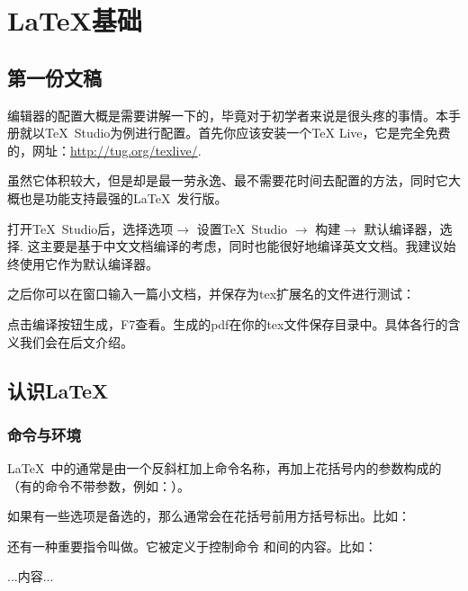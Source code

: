 \chapter{\LaTeX{}基础}
\section{第一份文稿}

编辑器的配置大概是需要讲解一下的，毕竟对于初学者来说是很头疼的事情。本手册就以\TeX\ Studio为例进行配置。首先你应该安装一个\TeX{} Live，它是完全免费的，网址：\url{http://tug.org/texlive/}.

虽然它体积较大，但是却是最一劳永逸、最不需要花时间去配置的方法，同时它大概也是功能支持最强的\LaTeX\ 发行版。

打开\TeX\ Studio后，选择选项$\rightarrow$ 设置\TeX\ Studio $\rightarrow$ 构建$\rightarrow$ 默认编译器，选择\xelatex{}. 这主要是基于中文文档编译的考虑，同时\xelatex 也能很好地编译英文文档。我建议始终使用它作为默认编译器。\dpar

之后你可以在窗口输入一篇小文档，并保存为tex扩展名的文件进行测试：

点击编译按钮生成，F7查看。生成的pdf在你的tex文件保存目录中。具体各行的含义我们会在后文介绍。

\section{认识\LaTeX}
\subsection{命令与环境}
\LaTeX\ 中的通常是由一个反斜杠加上命令名称，再加上花括号内的参数构成的（有的命令不带参数，例如：）。

如果有一些选项是备选的，那么通常会在花括号前用方括号标出。比如：

还有一种重要指令叫做。它被定义于控制命令 和间的内容。比如：
\begin{latex}

...内容...

\end{latex}

